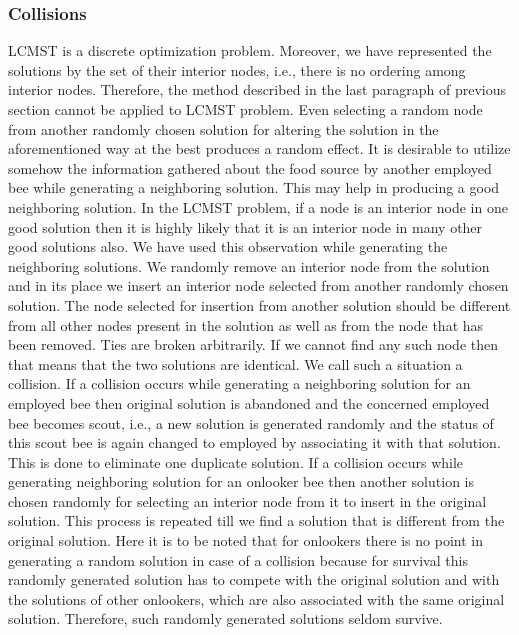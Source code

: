 \documentclass[pdftex,11pt]{article}
\begin{document}
\subsubsection{Collisions}
LCMST is a discrete optimization problem. Moreover, we have represented the solutions by the set of their interior nodes, i.e., there is no ordering among interior nodes. Therefore, the method described in the last paragraph of previous section cannot be applied to LCMST problem. Even selecting a random node from another randomly chosen solution for altering the solution in the aforementioned way at the best produces a random effect. It is desirable to utilize somehow the information gathered about the food source by another employed bee while generating a neighboring solution. This may help in producing a good neighboring solution. In the LCMST problem, if a node is an interior node in one good solution then it is highly likely that it is an interior node in many other good solutions also. We have used this observation while generating the neighboring solutions. We randomly remove an interior node from the solution and in its place we insert an interior node selected from another randomly chosen solution. The node selected for insertion from another solution should be different from all other nodes present in the solution as well as from the node that has been removed. Ties are broken arbitrarily. If we cannot find any such node then that means that the two solutions are identical. We call such a situation a collision. If a collision occurs while generating a neighboring solution for an employed bee then original solution is abandoned and the concerned employed bee becomes scout, i.e., a new solution is generated randomly and the status of this scout bee is again changed to employed by associating it with that solution. This is done to eliminate one duplicate solution. If a collision occurs while generating neighboring solution for an onlooker bee then another solution is chosen randomly for selecting an interior node from it to insert in the original solution. This process is repeated till we find a solution that is different from the original solution. Here it is to be noted that for onlookers there is no point in generating a random solution in case of a collision because for survival this randomly generated solution has to compete with the original solution and with the solutions of other onlookers, which are also associated with the same original solution. Therefore, such randomly generated solutions seldom survive.
\end{document}

